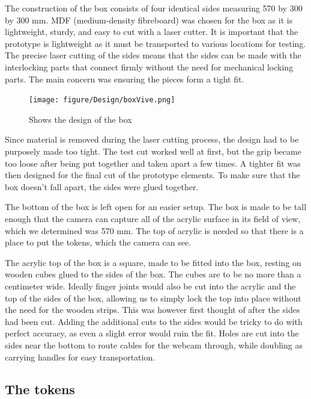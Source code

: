The construction of the box consists of four identical sides measuring 570 by 300 by 300 mm. MDF (medium-density fibreboard) was chosen for the box as it is lightweight, sturdy, and easy to cut with a laser cutter. It is important that the prototype is lightweight as it must be transported to various locations for testing. The precise laser cutting of the sides means that the sides can be made with the interlocking parts that connect firmly without the need for mechanical locking parts. The main concern was ensuring the pieces form a tight fit.
\begin{figure}[H]
	\centering
	\texttt{[image: figure/Design/boxVive.png]}
	\caption{Shows the design of the box}
	\label{fig:boxVive}
\end{figure}
 Since material is removed during the laser cutting process, the design had to be purposely made too tight. The test cut worked well at first, but the grip became too loose after being put together and taken apart a few times. A tighter fit was then designed for the final cut of the prototype elements. To make sure that the box doesn't fall apart, the sides were glued together. 

The bottom of the box is left open for an easier setup.
The box is made to be tall enough that the camera can capture all of the acrylic surface in its field of view, which we determined was 570 mm.
The top of acrylic is needed so that there is a place to put the tokens, which the camera can see.

The acrylic top of the box is a square, made to be fitted into the box, resting on wooden cubes glued to the sides of the box. The cubes are to be no more than a centimeter wide. Ideally finger joints would also be cut into the acrylic and the top of the sides of the box, allowing us to simply lock the top into place without the need for the wooden strips. This was however first thought of after the sides had been cut. Adding the additional cuts to the sides would be tricky to do with perfect accuracy, as even a slight error would ruin the fit. 
Holes are cut into the sides near the bottom to route cables for the webcam through, while doubling as carrying handles for easy transportation. 

\subsection{The tokens}

